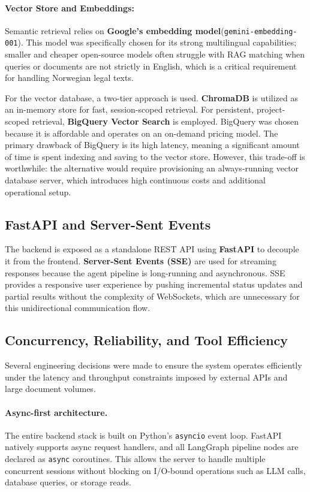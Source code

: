 \paragraph{Vector Store and Embeddings:}
Semantic retrieval relies on \textbf{Google's embedding model}\linebreak(\texttt{gemini-embedding-001}). This model was specifically chosen for its strong multilingual capabilities; smaller and cheaper open-source models often struggle with RAG matching when queries or documents are not strictly in English, which is a critical requirement for handling Norwegian legal texts.

For the vector database, a two-tier approach is used. \textbf{ChromaDB} is utilized as an in-memory store for fast, session-scoped retrieval. For persistent, project-scoped retrieval, \textbf{BigQuery Vector Search} is employed. BigQuery was chosen because it is affordable and operates on an on-demand pricing model. The primary drawback of BigQuery is its high latency, meaning a significant amount of time is spent indexing and saving to the vector store. However, this trade-off is worthwhile: the alternative would require provisioning an always-running vector database server, which introduces high continuous costs and additional operational setup.

\subsection{FastAPI and Server-Sent Events}

The backend is exposed as a standalone REST API using \textbf{FastAPI} \cite{fastapi} to decouple it from the frontend. \textbf{Server-Sent Events (SSE)} are used for streaming responses because the agent pipeline is long-running and asynchronous. SSE provides a responsive user experience by pushing incremental status updates and partial results without the complexity of WebSockets, which are unnecessary for this unidirectional communication flow.

\subsection{Concurrency, Reliability, and Tool Efficiency}

Several engineering decisions were made to ensure the system operates efficiently under the latency and throughput constraints imposed by external APIs and large document volumes.

\paragraph{Async-first architecture.}
The entire backend stack is built on Python's \texttt{asyncio} event loop. FastAPI natively supports async request handlers, and all LangGraph pipeline nodes are declared as \texttt{async} coroutines. This allows the server to handle multiple concurrent sessions without blocking on I/O-bound operations such as LLM calls, database queries, or storage reads.

